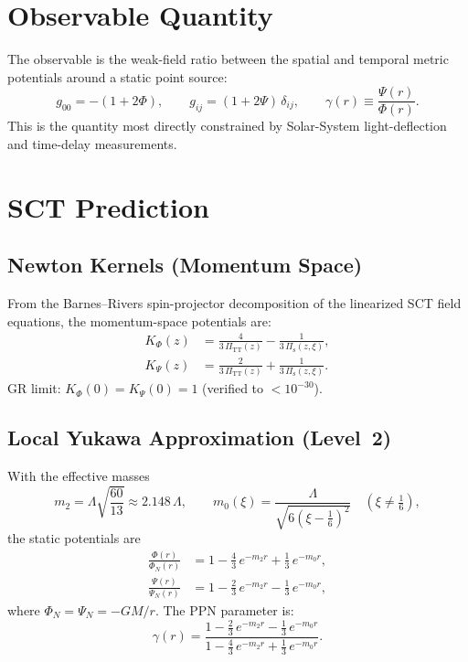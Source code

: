 \documentclass[11pt,a4paper]{article}
\begin{document}
\section{Observable Quantity}

The observable is the weak-field ratio between the spatial and temporal metric
potentials around a static point source:
\[
  g_{00} = -(1 + 2\Phi), \qquad
  g_{ij} = (1 + 2\Psi)\,\delta_{ij}, \qquad
  \gamma(r) \equiv \frac{\Psi(r)}{\Phi(r)}.
\]
This is the quantity most directly constrained by Solar-System light-deflection
and time-delay measurements.

\section{SCT Prediction}

\subsection{Newton Kernels (Momentum Space)}

From the Barnes--Rivers spin-projector decomposition of the linearized SCT
field equations, the momentum-space potentials are:
\begin{align}
  K_\Phi(z) &= \frac{4}{3\,\Pi_{\mathrm{TT}}(z)}
             - \frac{1}{3\,\Pi_{\mathrm{s}}(z,\xi)}, \\[4pt]
  K_\Psi(z) &= \frac{2}{3\,\Pi_{\mathrm{TT}}(z)}
             + \frac{1}{3\,\Pi_{\mathrm{s}}(z,\xi)}.
\end{align}
GR limit: $K_\Phi(0) = K_\Psi(0) = 1$ (verified to $<10^{-30}$).

\subsection{Local Yukawa Approximation (Level~2)}

With the effective masses
\[
  m_2 = \Lambda\sqrt{\frac{60}{13}} \approx 2.148\,\Lambda, \qquad
  m_0(\xi) = \frac{\Lambda}{\sqrt{6\!\left(\xi-\tfrac{1}{6}\right)^{\!2}}}
  \quad (\xi \ne \tfrac{1}{6}),
\]
the static potentials are
\begin{align}
  \frac{\Phi(r)}{\Phi_N(r)} &= 1 - \tfrac{4}{3}\,e^{-m_2 r}
                              + \tfrac{1}{3}\,e^{-m_0 r}, \\[4pt]
  \frac{\Psi(r)}{\Psi_N(r)} &= 1 - \tfrac{2}{3}\,e^{-m_2 r}
                              - \tfrac{1}{3}\,e^{-m_0 r},
\end{align}
where $\Phi_N = \Psi_N = -GM/r$.  The PPN parameter is:
\begin{equation}
  \boxed{
  \gamma(r) =
  \frac{1 - \frac{2}{3}\,e^{-m_2 r} - \frac{1}{3}\,e^{-m_0 r}}
       {1 - \frac{4}{3}\,e^{-m_2 r} + \frac{1}{3}\,e^{-m_0 r}}.
  }
  \label{eq:gamma-ppn}
\end{equation}
\end{document}
